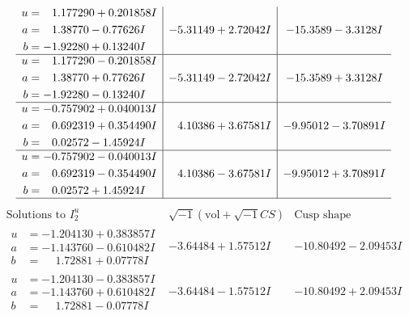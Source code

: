 \documentclass[1p]{elsarticle_modified}
\theoremstyle{definition}
\newcommand{\I}{\sqrt{-1}}
\begin{document}
$$\begin{array}{c|c|c}
\begin{aligned}
u &= \phantom{-}1.177290 + 0.201858 I \\
a &= \phantom{-}1.38770 - 0.77626 I \\
b &= -1.92280 + 0.13240 I\end{aligned}
 & -5.31149 + 2.72042 I & -15.3589 - 3.3128 I \\ \hline\begin{aligned}
u &= \phantom{-}1.177290 - 0.201858 I \\
a &= \phantom{-}1.38770 + 0.77626 I \\
b &= -1.92280 - 0.13240 I\end{aligned}
 & -5.31149 - 2.72042 I & -15.3589 + 3.3128 I \\ \hline\begin{aligned}
u &= -0.757902 + 0.040013 I \\
a &= \phantom{-}0.692319 + 0.354490 I \\
b &= \phantom{-}0.02572 - 1.45924 I\end{aligned}
 & \phantom{-}4.10386 + 3.67581 I & -9.95012 - 3.70891 I \\ \hline\begin{aligned}
u &= -0.757902 - 0.040013 I \\
a &= \phantom{-}0.692319 - 0.354490 I \\
b &= \phantom{-}0.02572 + 1.45924 I\end{aligned}
 & \phantom{-}4.10386 - 3.67581 I & -9.95012 + 3.70891 I\\
 \hline 
 \end{array}$$\newpage$$\begin{array}{c|c|c}  
\text{Solutions to }I^u_{2}& \I (\text{vol} + \sqrt{-1}CS) & \text{Cusp shape}\\
 \hline 
\begin{aligned}
u &= -1.204130 + 0.383857 I \\
a &= -1.143760 - 0.610482 I \\
b &= \phantom{-}1.72881 + 0.07778 I\end{aligned}
 & -3.64484 + 1.57512 I & -10.80492 - 2.09453 I \\ \hline\begin{aligned}
u &= -1.204130 - 0.383857 I \\
a &= -1.143760 + 0.610482 I \\
b &= \phantom{-}1.72881 - 0.07778 I\end{aligned}
 & -3.64484 - 1.57512 I & -10.80492 + 2.09453 I \\ \hline\begin{aligned}

\end{aligned}
\end{array}$$
\end{document}
